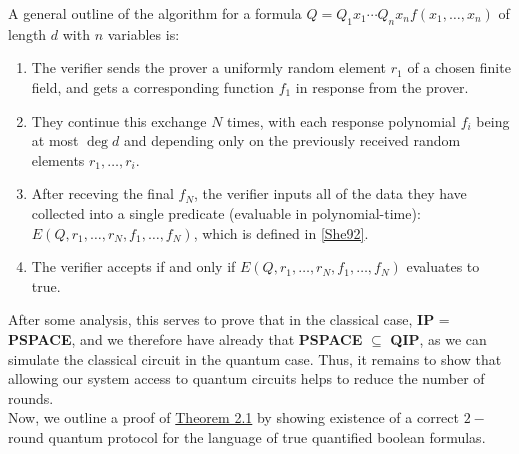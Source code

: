 \documentclass[12pt]{article}
\numberwithin{thm}{section}
\numberwithin{defn}{section}
\numberwithin{prop}{section}
\numberwithin{rmk}{section}
\begin{document}
	\noindent A general outline of the algorithm for a formula $Q=Q_1x_1\cdots Q_nx_nf(x_1,\dots,x_n)$ of length $d$ with $n$ variables is:
	 \begin{enumerate}
	 	\item The verifier sends the prover a uniformly random element $r_1$ of a chosen finite field, and gets a corresponding function $f_1$ in response from the prover.
	 	\item They continue this exchange $N$ times, with each response polynomial $f_i$ being at most $\deg d$ and  depending only on the previously received random elements $r_1,\dots,r_{i}$. 
	 	\item After receving  the final $f_N$, the verifier inputs all of the data they have collected into a single predicate (evaluable in polynomial-time): $E(Q,r_1,\dots,r_N,f_1,\dots,f_N)$, which is defined in \hyperref[she92]{[She92]}.
	 	\item The verifier accepts if and only if $E(Q,r_1,\dots,r_N,f_1,\dots,f_N)$ evaluates to true.
	 \end{enumerate}
	 	
	After some analysis, this serves to prove that in the classical case, \textbf{IP} = \textbf{PSPACE}, and we therefore have already that \textbf{PSPACE} $\subseteq$ \textbf{QIP}, as we can simulate the classical circuit in the quantum case. Thus, it remains to show that allowing our system access to quantum circuits helps to reduce the number of rounds.\\
	
	Now, we outline a proof of \hyperref[thm1]{Theorem 2.1} by showing existence of a correct $2-$round quantum protocol for the language of true quantified boolean formulas.
	
\end{document}
